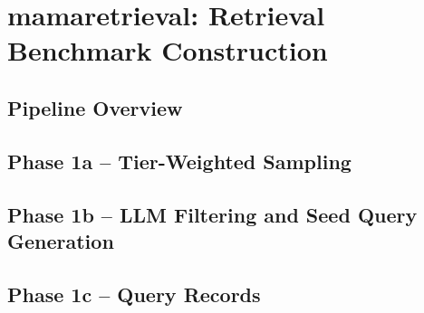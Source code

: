 \section{mamaretrieval: Retrieval Benchmark Construction}

\subsection{Pipeline Overview}

\subsection{Phase 1a -- Tier-Weighted Sampling}

\subsection{Phase 1b -- LLM Filtering and Seed Query Generation}

\subsection{Phase 1c -- Query Records}

